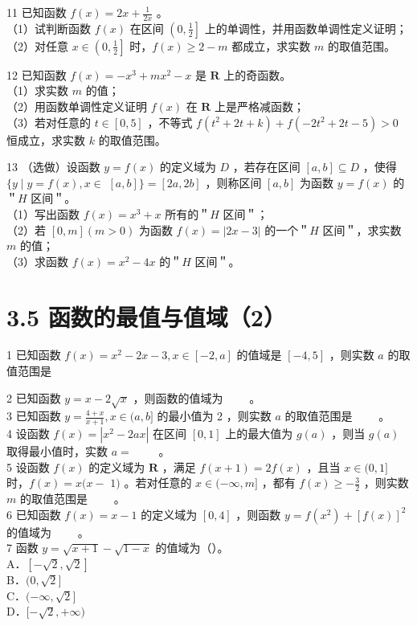 \documentclass[10pt]{article}
\begin{document}
11 已知函数 \(f(x)=2 x+\frac{1}{2 x}\) 。\\
（1）试判断函数 \(f(x)\) 在区间 \(\left(0, \frac{1}{2}\right]\) 上的单调性，并用函数单调性定义证明；\\
（2）对任意 \(x \in\left(0, \frac{1}{2}\right]\) 时，\(f(x) \geqslant 2-m\) 都成立，求实数 \(m\) 的取值范围。

12 已知函数 \(f(x)=-x^{3}+m x^{2}-x\) 是 \(\mathbf{R}\) 上的奇函数。\\
（1）求实数 \(m\) 的值；\\
（2）用函数单调性定义证明 \(f(x)\) 在 \(\mathbf{R}\) 上是严格减函数；\\
（3）若对任意的 \(t \in[0,5]\) ，不等式 \(f\left(t^{2}+2 t+k\right)+f\left(-2 t^{2}+2 t-5\right)>0\) 恒成立，求实数 \(k\) 的取值范围。

13 （选做）设函数 \(y=f(x)\) 的定义域为 \(D\) ，若存在区间 \([a, b] \subseteq D\) ，使得 \(\{y \mid y=f(x), x \in\) \([a, b]\}=[2 a, 2 b]\) ，则称区间 \([a, b]\) 为函数 \(y=f(x)\) 的＂\(H\) 区间＂。\\
（1）写出函数 \(f(x)=x^{3}+x\) 所有的＂\(H\) 区间＂；\\
（2）若 \([0, m](m>0)\) 为函数 \(f(x)=|2 x-3|\) 的一个＂\(H\) 区间＂，求实数 \(m\) 的值；\\
（3）求函数 \(f(x)=x^{2}-4 x\) 的＂\(H\) 区间＂。

\section*{3.5 函数的最值与值域（2）}
1 已知函数 \(f(x)=x^{2}-2 x-3, x \in[-2, a]\) 的值域是 \([-4,5]\) ，则实数 \(a\) 的取值范围是

2 已知函数 \(y=x-2 \sqrt{x}\) ，则函数的值域为 \(\qquad\)。\\
3 已知函数 \(y=\frac{4+x}{x+1}, x \in(a, b]\) 的最小值为 2 ，则实数 \(a\) 的取值范围是 \(\qquad\)。\\
4 设函数 \(f(x)=\left|x^{2}-2 a x\right|\) 在区间 \([0,1]\) 上的最大值为 \(g(a)\) ，则当 \(g(a)\) 取得最小值时，实数 \(a=\) \(\qquad\)。\\
5 设函数 \(f(x)\) 的定义域为 \(\mathbf{R}\) ，满足 \(f(x+1)=2 f(x)\) ，且当 \(x \in(0,1]\) 时，\(f(x)=x(x-\) \(1)\) 。若对任意的 \(x \in(-\infty, m]\) ，都有 \(f(x) \geqslant-\frac{3}{2}\) ，则实数 \(m\) 的取值范围是 \(\qquad\)。\\
6 已知函数 \(f(x)=x-1\) 的定义域为 \([0,4]\) ，则函数 \(y=f\left(x^{2}\right)+[f(x)]^{2}\) 的值域为 \(\qquad\)。\\
7 函数 \(y=\sqrt{x+1}-\sqrt{1-x}\) 的值域为（）。\\
A．\([-\sqrt{2}, \sqrt{2}]\)\\
B．\((0, \sqrt{2}]\)\\
C．\((-\infty, \sqrt{2}]\)\\
D．\([-\sqrt{2},+\infty)\)
\end{document}
